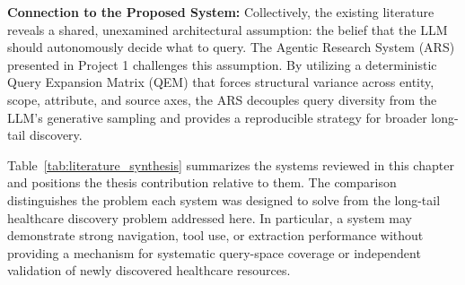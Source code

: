 \documentclass[12pt,oneside]{report}
\begin{document}
\textbf{Connection to the Proposed System:} Collectively, the existing literature reveals a shared, unexamined architectural assumption: the belief that the LLM should autonomously decide what to query. The Agentic Research System (ARS) presented in Project 1 challenges this assumption. By utilizing a deterministic Query Expansion Matrix (QEM) that forces structural variance across entity, scope, attribute, and source axes, the ARS decouples query diversity from the LLM's generative sampling and provides a reproducible strategy for broader long-tail discovery.

Table~\ref{tab:literature_synthesis} summarizes the systems reviewed in this chapter and positions the thesis contribution relative to them. The comparison distinguishes the problem each system was designed to solve from the long-tail healthcare discovery problem addressed here. In particular, a system may demonstrate strong navigation, tool use, or extraction performance without providing a mechanism for systematic query-space coverage or independent validation of newly discovered healthcare resources.
\end{document}
